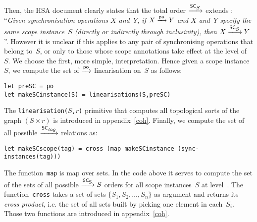 \documentclass[a4paper]{article}
\begin{document}
Then, the HSA  document clearly states that the total order $\xrightarrow{\textsf{\scriptsize{}SC$_{\textsf{\scriptsize{}$S$}}$}}$
extends \po{}: ``\emph{Given synchronisation operations $X$ and~$Y$, if $X \xrightarrow{\textsf{\scriptsize{}po}} Y$ and $X$ and~$Y$ specify the same scope instance~$S$ (directly or indirectly
through inclusivity), then $X \xrightarrow{\textsf{\scriptsize{}SC$_{\textsf{\scriptsize{}$S$}}$}} Y$}''.
However it is unclear if this applies to any pair of synchronising operations
that belong to~$S$, or only to those whose scope annotations take effect
at the level of~$S$. 
We choose the first, more simple, interpretation. Hence given a scope
instance~$S$, we compute the set of $\xrightarrow{\textsf{\scriptsize{}po}}$ linearisation on~$S$ as follows:
\begin{verbatim}
let preSC = po
let makeSCinstance(S) = linearisations(S,preSC)
\end{verbatim}
The \texttt{linearisation($S$,$r$)} primitive that computes all topological sorts of the graph $(S \times r)$ is introduced in appendix~\ref{coh}.
Finally, we compute the set of all possible $\xrightarrow{\textsf{\scriptsize{}SC$_{\textsf{\scriptsize{}{\it\scriptsize{}tag}}}$}}$ relations as:
\begin{verbatim}
let makeSCscope(tag) = cross (map makeSCinstance (sync-instances(tag)))
\end{verbatim}
The function~\texttt{map} is map over sets. In the code above it serves
to compute the set of the sets of all possible $\xrightarrow{\textsf{\scriptsize{}SC$_{\textsf{\scriptsize{}{\ensuremath{}S}}}$}}{S}$ orders
for all scope instances~$S$ at level~.
The function~\texttt{cross} takes a set of sets $\{S_1,S_2,\ldots,S_n\}$ as
argument and returns its \emph{cross product}, i.e. the set of all sets built
by picking one element in each~$S_i$. Those two functions are introduced in
appendix~\ref{coh}.


\end{document}
